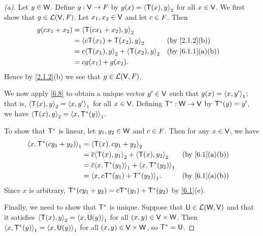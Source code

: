 \begin{proof}[(a)]
  Let \(y \in \mathsf{W}\).
  Define \(g : \mathsf{V} \to \mathit{F}\) by \(g(x) = \left\langle\mathsf{T}(x), y\right\rangle_2\) for all \(x \in \mathsf{V}\).
  We first show that \(g \in \mathcal{L}(\mathsf{V}, \mathit{F})\).
  Let \(x_1, x_2 \in \mathsf{V}\) and let \(c \in \mathit{F}\).
  Then
  \begin{align*}
    g(c x_1 + x_2) & = \inn{\T(c x_1 + x_2), y}_2                                                    \\
                   & = \inn{c \T(x_1) + \T(x_2), y}_2            &  & \text{(by \cref{2.1.2}(b))}    \\
                   & = c \inn{\T(x_1), y}_2 + \inn{\T(x_2), y}_2 &  & \text{(by \cref{6.1.1}(a)(b))} \\
                   & = c g(x_1) + g(x_2).
  \end{align*}
  Hence by \cref{2.1.2}(b) we see that \(g \in \mathcal{L}(\mathsf{V}, \mathit{F})\).

  We now apply \cref{6.8} to obtain a unique vector \(y' \in \mathsf{V}\) such that \(g(x) = \left\langle x, y'\right\rangle_1\);
  that is, \(\left\langle\mathsf{T}(x), y\right\rangle_2 = \left\langle x, y'\right\rangle_1\) for all \(x \in \mathsf{V}\).
  Defining \(\mathsf{T}^* : \mathsf{W} \to \mathsf{V}\) by \(\mathsf{T}^*(y) = y'\), we have \(\left\langle\mathsf{T}(x), y\right\rangle_2 = \left\langle x, \mathsf{T}^*(y)\right\rangle_1\).

  To show that \(\mathsf{T}^*\) is linear, let \(y_1, y_2 \in \mathsf{W}\) and \(c \in \mathit{F}\).
  Then for any \(x \in \mathsf{V}\),
  we have
  \begin{align*}
    \inn{x, \T^*(c y_1 + y_2)}_1 & = \inn{\T(x), c y_1 + y_2}_2                                                             \\
                                 & = \conj{c} \inn{\T(x), y_1}_2 + \inn{\T(x), y_2}_2     &  & \text{(by \cref{6.1}(a)(b))} \\
                                 & = \conj{c} \inn{x, \T^*(y_1)}_1 + \inn{x, \T^*(y_2)}_1                                   \\
                                 & = \inn{x, c \T^*(y_1) + \T^*(y_2)}_1.                  &  & \text{(by \cref{6.1}(a)(b))}
  \end{align*}
  Since \(x\) is arbitrary, \(\mathsf{T}^*(c y_1 + y_2) = c \mathsf{T}^*(y_1) + \mathsf{T}^*(y_2)\) by \cref{6.1}(e).

  Finally, we need to show that \(\mathsf{T}^*\) is unique. Suppose that \(\mathsf{U} \in \mathcal{L}(\mathsf{W}, \mathsf{V})\) and that it satisfies \(\left\langle\mathsf{T}(x), y\right\rangle_2 = \left\langle x, \mathsf{U}(y)\right\rangle_1\) for all \((x, y) \in \mathsf{V} \times \mathsf{W}\).
  Then \(\left\langle x, \mathsf{T}^*(y)\right\rangle_1 = \left\langle x, \mathsf{U}(y)\right\rangle_1\) for all \((x, y) \in \mathsf{V} \times \mathsf{W}\), so \(\mathsf{T}^* = \mathsf{U}\).
\end{proof}

